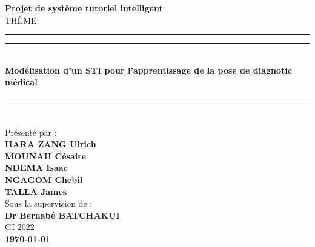 \begin{titlingpage}
\begin{singlespace}
    \begin{center}
    \bigskip{}
    	{\LARGE\textbf{Projet de système tutoriel intelligent }}\\
    	\vspace{5mm}
    	{\large\textsc{THÈME:}}\\
    	\vspace{5mm}
        \rule[0.5ex]{\linewidth}{2pt}\vspace*{-\baselineskip}\vspace*{3.2pt}
        \rule[0.5ex]{\linewidth}{1pt}\\[\baselineskip]
        {\LARGE \textcolor{stroke1}{ \textbf{Modélisation d'un STI pour l'apprentissage de la pose de  diagnotic médical}} }\\[4mm]
        \rule[0.5ex]{\linewidth}{1pt}\vspace*{-\baselineskip}\vspace{3.2pt}
        \rule[0.5ex]{\linewidth}{2pt}\\
        \vspace{0.5cm}
        {\large Présenté par :}\\
        \vspace{3mm}
        {\large \textbf{HARA ZANG Ulrich \\ MOUNAH Césaire \\ NDEMA Isaac\\ NGAGOM Chebil \\ TALLA James}}\\
        \vspace{5mm}
        {\large Sous la supervision de :\\
        	\vspace{5mm}
        \textbf{Dr Bernabé BATCHAKUI}}\\
        \vspace{1cm}
        {\large\textsc{GI 2022}} \\
        {\large\textbf{\today}}
    \end{center}

\end{singlespace}
\end{titlingpage}

\restoregeometry
